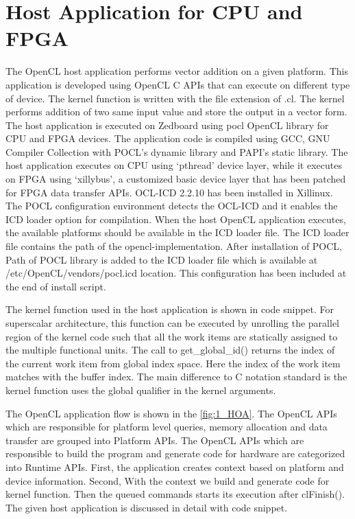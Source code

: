 \section{Host Application for CPU and FPGA}
The OpenCL host application performs vector addition on a given platform. This application is developed using OpenCL C APIs that can execute on different type of device. The kernel function is written with the file extension of .cl. The kernel performs addition of two same input value and store the output in a vector form. The host application is executed on Zedboard using pocl OpenCL library for CPU and FPGA devices. The application code is compiled using GCC, GNU Compiler Collection with POCL’s dynamic library and PAPI’s static library. The host application executes on CPU using ‘pthread’ device layer, while it executes on FPGA using ‘xillybus’, a customized basic device layer that has been patched for FPGA data transfer APIs.  
OCL-ICD 2.2.10 has been installed in Xillinux. The POCL configuration environment detects the OCL-ICD and it enables the ICD loader option for compilation. When the host OpenCL application executes, the available platforms should be available in the ICD loader file. The ICD loader file contains the path of the opencl-implementation. After installation of POCL, Path of POCL library is added to the ICD loader file which is available at /etc/OpenCL/vendors/pocl.icd location. This configuration has been included at the end of install script.

The kernel function used in the host application is shown in code snippet. For superscalar architecture, this function can be executed by unrolling the parallel region of the kernel code such that all the work items are statically assigned to the multiple functional units. The call to get\_global\_id() returns the index of the current work item from global index space. Here the index of the work item matches with the buffer index. The main difference to C notation standard is the kernel function uses the global qualifier in the kernel arguments. 
	

The OpenCL application flow is shown in the \ref{fig:1_HOA}. The OpenCL APIs which are responsible for platform level queries, memory allocation and data transfer are grouped into Platform APIs. The OpenCL APIs which are responsible to build the program and generate code for hardware are categorized into Runtime APIs. First, the application creates context based on platform and device information. Second, With the context we build and generate code for kernel function. Then the queued commands starts its execution after clFinish(). The given host application is discussed in detail with code snippet.



